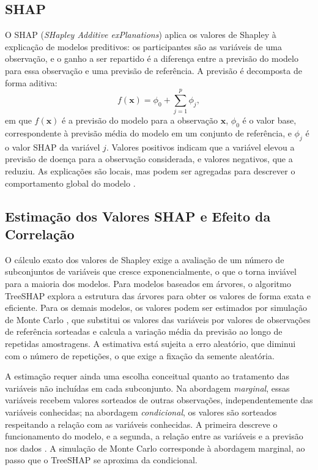 \subsection{SHAP}
\label{sec:fund_shap}

O SHAP (\textit{SHapley Additive exPlanations}) \cite{Lundberg2017Unified} aplica os valores de Shapley à explicação de modelos preditivos: os participantes são as variáveis de uma observação, e o ganho a ser repartido é a diferença entre a previsão do modelo para essa observação e uma previsão de referência. A previsão é decomposta de forma aditiva:
\begin{equation}
    f(\mathbf{x}) = \phi_0 + \sum_{j=1}^{p} \phi_j,
    \label{eq:shap_aditivo}
\end{equation}
em que $f(\mathbf{x})$ é a previsão do modelo para a observação $\mathbf{x}$, $\phi_0$ é o valor base, correspondente à previsão média do modelo em um conjunto de referência, e $\phi_j$ é o valor SHAP da variável $j$. Valores positivos indicam que a variável elevou a previsão de doença para a observação considerada, e valores negativos, que a reduziu. As explicações são locais, mas podem ser agregadas para descrever o comportamento global do modelo \cite{Lundberg2020Trees}.

\subsection{Estimação dos Valores SHAP e Efeito da Correlação}
\label{sec:fund_estimacao}
\label{sec:fund_dependencia}

O cálculo exato dos valores de Shapley exige a avaliação de um número de subconjuntos de variáveis que cresce exponencialmente, o que o torna inviável para a maioria dos modelos. Para modelos baseados em árvores, o algoritmo TreeSHAP \cite{Lundberg2020Trees} explora a estrutura das árvores para obter os valores de forma exata e eficiente. Para os demais modelos, os valores podem ser estimados por simulação de Monte Carlo \cite{Strumbelj2014Explaining}, que substitui os valores das variáveis por valores de observações de referência sorteadas e calcula a variação média da previsão ao longo de repetidas amostragens. A estimativa está sujeita a erro aleatório, que diminui com o número de repetições, o que exige a fixação da semente aleatória.

A estimação requer ainda uma escolha conceitual quanto ao tratamento das variáveis não incluídas em cada subconjunto. Na abordagem \textit{marginal}, essas variáveis recebem valores sorteados de outras observações, independentemente das variáveis conhecidas; na abordagem \textit{condicional}, os valores são sorteados respeitando a relação com as variáveis conhecidas. A primeira descreve o funcionamento do modelo, e a segunda, a relação entre as variáveis e a previsão nos dados \cite{Chen2020TrueToModel, Chen2023Algorithms}. A simulação de Monte Carlo corresponde à abordagem marginal, ao passo que o TreeSHAP se aproxima da condicional.

